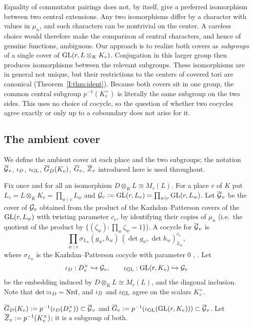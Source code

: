 Equality of commutator pairings does not, by itself, give a preferred isomorphism between two central extensions. Any two isomorphisms differ by a character with values in $\mu_n$, and such characters can be nontrivial on the center. A careless choice would therefore make the comparison of central characters, and hence of genuine functions, ambiguous. Our approach is to realize both covers as \emph{subgroups} of a single cover of $\mathrm{GL}(r,L\otimes_KK_v)$. Conjugation in this larger group then produces isomorphisms between the relevant subgroups. These isomorphisms are in general not unique, but their restrictions to the centers of covered tori are canonical (Theorem~\ref{I:thm:ident}). Because both covers sit in one group, the common central subgroup $p^{-1}(K_v^\times)$ is literally the same subgroup on the two sides. This uses no choice of cocycle, so the question of whether two cocycles agree exactly or only up to a coboundary does not arise for it.

\subsection{The ambient cover}\label{I:subsec:ambient}
We define the ambient cover at each place and the two subgroups; the notation $\overline{\mathcal{G}}_v$, $\iota_D$, $\iota_{\mathrm{GL}}$, $\overline{G}_D(K_v)$, $\overline{G}_v$, $\overline{Z}_v$ introduced here is used throughout.

Fix once and for all an isomorphism $D\otimes_KL\cong M_r(L)$. For a place $v$ of $K$ put $L_v=L\otimes_KK_v=\prod_{w\mid v}L_w$ and $\mathcal{G}_v:=\mathrm{GL}(r,L_v)=\prod_{w\mid v}\mathrm{GL}(r,L_w)$. Let $\overline{\mathcal{G}}_v$ be the cover of $\mathcal{G}_v$ obtained from the product of the Kazhdan--Patterson covers of the $\mathrm{GL}(r,L_w)$ with twisting parameter $c_v$, by identifying their copies of $\mu_n$ (i.e.\ the quotient of the product by $\{(\zeta_w):\prod_w\zeta_w=1\}$). A cocycle for $\overline{\mathcal{G}}_v$ is
\begin{equation}\label{I:eq:ambient}
\prod_{w\mid v}\sigma_{L_w}(g_w,h_w)\,(\det g_w,\det h_w)_{L_w}^{c_v},
\end{equation}
where $\sigma_{L_w}$ is the Kazhdan--Patterson cocycle with parameter $0$ \cite[\S0.1]{KP84}, \cite[\S2]{FK86}. Let
\[ \iota_D:D_v^\times\hookrightarrow\mathcal{G}_v,\qquad \iota_{\mathrm{GL}}:\mathrm{GL}(r,K_v)\hookrightarrow\mathcal{G}_v \]
be the embedding induced by $D\otimes_KL\cong M_r(L)$, and the diagonal inclusion. Note that $\det\circ\iota_D=\operatorname{Nrd}$, and $\iota_D$ and $\iota_{\mathrm{GL}}$ agree on the scalars $K_v^\times$.

\begin{definition}\label{I:def:localcovers}
$\overline{G}_D(K_v):=p^{-1}(\iota_D(D_v^\times))\subset\overline{\mathcal{G}}_v$ and $\overline{G}_v:=p^{-1}(\iota_{\mathrm{GL}}(\mathrm{GL}(r,K_v)))\subset\overline{\mathcal{G}}_v$. Let $\overline{Z}_v:=p^{-1}(K_v^\times)$; it is a subgroup of both.
\end{definition}

